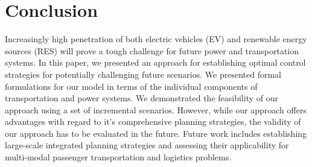 \section{Conclusion}
\label{conclusion}

Increasingly high penetration of both electric vehicles (EV) and renewable energy sources (RES) will prove a tough challenge for future power and transportation systems. In this paper, we presented an approach for establishing optimal control strategies for potentially challenging future scenarios. We presented formal formulations for our model in terms of the individual components of transportation and power systems. We demonstrated the feasibility of our approach using a set of incremental scenarios. However, while our approach offers advantages with regard to it's comprehensive planning strategies, the validity of our approach has to be evaluated in the future. Future work includes establishing large-scale integrated planning strategies and assessing their applicability for multi-modal passenger transportation and logistics problems.

